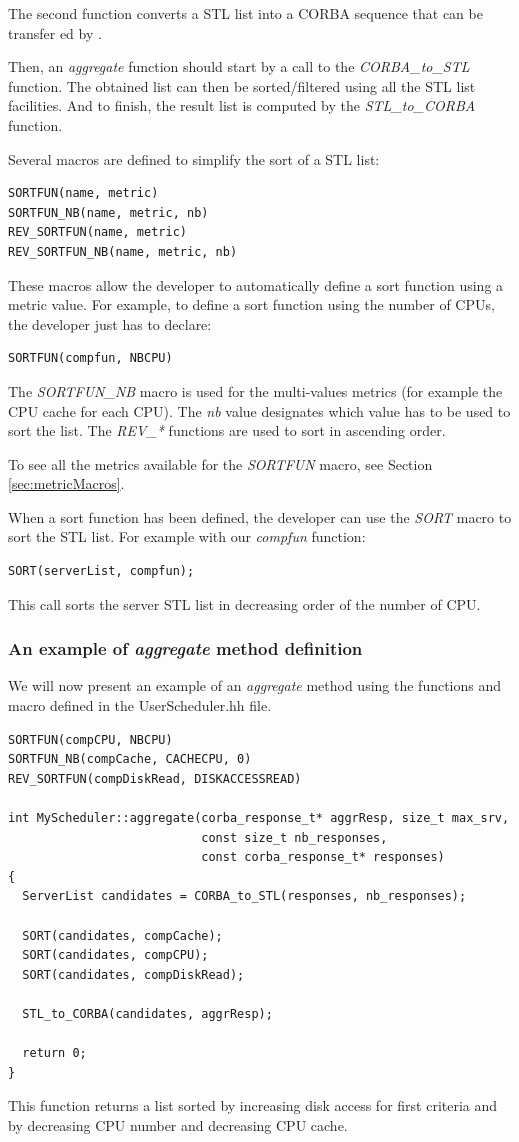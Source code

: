 \noindent The second function converts a STL list into a CORBA sequence that
can be transfer ed by \diet.

Then, an \textit{aggregate} function should start by a call to the
\textit{CORBA\_to\_STL} function. The obtained list can then be sorted/filtered
using all the STL list facilities. And to finish, the result list is computed
by the \textit{STL\_to\_CORBA} function.

Several macros are defined to simplify the
sort of a STL list:
\begin{verbatim}
SORTFUN(name, metric)
SORTFUN_NB(name, metric, nb)
REV_SORTFUN(name, metric)
REV_SORTFUN_NB(name, metric, nb)
\end{verbatim}
These macros allow the developer to automatically define a sort function
using a metric value. For example, to define a sort function using the
number of CPUs, the developer just has to declare:
\begin{verbatim}
SORTFUN(compfun, NBCPU)
\end{verbatim}
The \textit{SORTFUN\_NB} macro is used for the multi-values metrics (for
example the CPU cache for each CPU). The \textit{nb} value designates which
value has to be used to sort the list.
The \textit{REV\_*} functions are used to sort in ascending order.

To see all the metrics available for the \textit{SORTFUN} macro, see Section
\ref{sec:metricMacros}.

When a sort function has been defined, the developer can use the \textit{SORT}
macro to sort the STL list. For example with our \textit{compfun} function:
\begin{verbatim}
SORT(serverList, compfun);
\end{verbatim}
This call sorts the server STL list in decreasing order of the number of CPU.

\subsubsection{An example of \textit{aggregate} method definition}
We will now present an example of an \textit{aggregate} method using the
functions and macro defined in the UserScheduler.hh file.
\begin{verbatim}
SORTFUN(compCPU, NBCPU)
SORTFUN_NB(compCache, CACHECPU, 0)
REV_SORTFUN(compDiskRead, DISKACCESSREAD)

int MyScheduler::aggregate(corba_response_t* aggrResp, size_t max_srv,
                           const size_t nb_responses,
                           const corba_response_t* responses)
{
  ServerList candidates = CORBA_to_STL(responses, nb_responses);

  SORT(candidates, compCache);
  SORT(candidates, compCPU);
  SORT(candidates, compDiskRead);

  STL_to_CORBA(candidates, aggrResp);

  return 0;
}
\end{verbatim}
This function returns a list sorted by increasing disk access for first criteria
and by decreasing CPU number and decreasing CPU cache.

